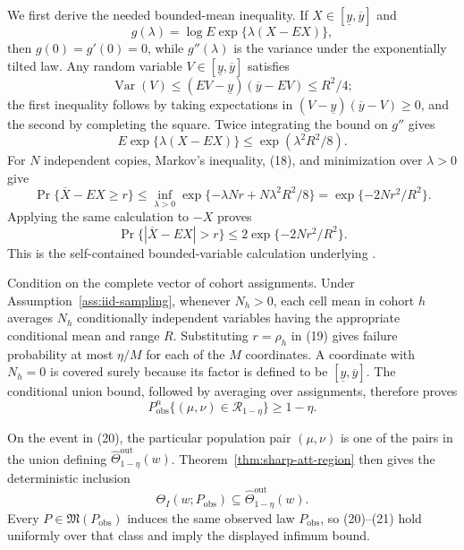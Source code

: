 We first derive the needed bounded-mean inequality.  If \(X\in[\underline y,\overline y]\) and
\[
 g(\lambda)=\log E\exp\{\lambda(X-EX)\},
\]
then \(g(0)=g'(0)=0\), while \(g''(\lambda)\) is the variance under the exponentially tilted law.  Any random variable \(V\in[\underline y,\overline y]\) satisfies
\[
 \operatorname{Var}(V)
 \le(EV-\underline y)(\overline y-EV)
 \le R^2/4;
\]
the first inequality follows by taking expectations in \((V-\underline y)(\overline y-V)\ge0\), and the second by completing the square.  Twice integrating the bound on \(g''\) gives
\[
 E\exp\{\lambda(X-EX)\}\le\exp(\lambda^2R^2/8). \tag{18}
\]
For \(N\) independent copies, Markov's inequality, (18), and minimization over \(\lambda>0\) give
\[
 \Pr\{\overline X-EX\ge r\}
 \le\inf_{\lambda>0}\exp\{-\lambda Nr+N\lambda^2R^2/8\}
 =\exp\{-2Nr^2/R^2\}.
\]
Applying the same calculation to \(-X\) proves
\[
 \Pr\{|\overline X-EX|>r\}\le2\exp\{-2Nr^2/R^2\}. \tag{19}
\]
This is the self-contained bounded-variable calculation underlying \cite{Hoeffding1963}.

Condition on the complete vector of cohort assignments.  Under Assumption~\ref{ass:iid-sampling}, whenever \(N_h>0\), each cell mean in cohort \(h\) averages \(N_h\) conditionally independent variables having the appropriate conditional mean and range \(R\).  Substituting \(r=\rho_h\) in (19) gives failure probability at most \(\eta/M\) for each of the \(M\) coordinates.  A coordinate with \(N_h=0\) is covered surely because its factor is defined to be \([\underline y,\overline y]\).  The conditional union bound, followed by averaging over assignments, therefore proves
\[
 P_{\mathrm{obs}}^n\{(\mu,\nu)\in\mathcal R_{1-\eta}\}\ge1-\eta. \tag{20}
\]

On the event in (20), the particular population pair \((\mu,\nu)\) is one of the pairs in the union defining \(\widehat\Theta^{\mathrm{out}}_{1-\eta}(w)\).  Theorem~\ref{thm:sharp-att-region} then gives the deterministic inclusion
\[
 \Theta_I(w;P_{\mathrm{obs}})
 \subseteq\widehat\Theta^{\mathrm{out}}_{1-\eta}(w). \tag{21}
\]
Every \(P\in\mathfrak M(P_{\mathrm{obs}})\) induces the same observed law \(P_{\mathrm{obs}}\), so (20)--(21) hold uniformly over that class and imply the displayed infimum bound.

